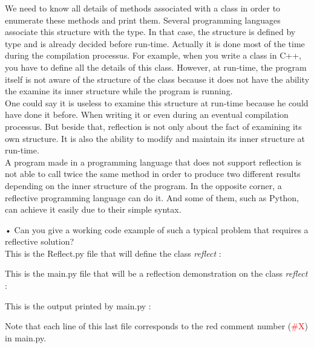 We need to know all details of methods associated with a class in order to enumerate these methods and print them. Several programming languages associate this structure with the type. In that case, the structure is defined by type and is already decided before run-time. Actually it is done most of the time during the compilation processus. For example, when you write a class in C++, you have to define all the details of this class. However, at run-time, the program itself is not aware of the structure of the class because it does not have the ability the examine its inner structure while the program is running.\\
One could say it is useless to examine this structure at run-time because he could have done it before. When writing it or even during an eventual compilation processus. But beside that, reflection is not only about the fact of examining its own structure. It is also the ability to modify and maintain its inner structure at run-time.\\
A program made in a programming language that does not support reflection is not able to call twice the same method in order to produce two different results depending on the inner structure of the program. In the opposite corner, a reflective programming language can do it. And some of them, such as Python, can achieve it easily due to their simple syntax. \cite{assembleforce}
\newline


•	Can you give a working code example of such a typical problem that requires a reflective solution?\\

This is the Reflect.py file that will define the class \emph{reflect} :


This is the main.py file that will be a reflection demonstration on the class \emph{reflect} :


This is the output printed by main.py :

Note that each line of this last file corresponds to the red comment number (\textcolor{red}{\#X}) in main.py.\\ 

